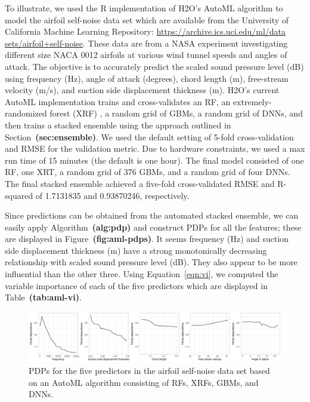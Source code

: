 \documentclass[12pt]{article}
\def\ref#1{\textbf{(#1)}}
\begin{document}
To illustrate, we used the R implementation of H2O's AutoML algorithm to model the airfoil self-noise data set \citep{uciml} which are available from the University of California Machine Learning Repository: \url{https://archive.ics.uci.edu/ml/data sets/airfoil+self-noise}. These data are from a NASA experiment investigating different size NACA 0012 airfoils at various wind tunnel speeds and angles of attack. The objective is to accurately predict the scaled sound pressure level (dB) using frequency (Hz), angle of attack (degrees), chord length (m), free-stream velocity (m/s), and suction side displacement thickness (m). H2O's current AutoML implementation trains and cross-validates an RF, an extremely-randomized forest (XRF) \citep{extremely-geurts-2006}, a random grid of GBMs, a random grid of DNNs, and then trains a stacked ensemble using the approach outlined in Section~\ref{sec:ensemble}. We used the default setting of 5-fold cross-validation and RMSE for the validation metric. Due to hardware constraints, we used a max run time of 15 minutes (the default is one hour). The final model consisted of one RF, one XRT, a random grid of 376 GBMs, and a random grid of four DNNs. The final stacked ensemble achieved a five-fold cross-validated RMSE and R-squared of 1.7131835 and 0.93870246, respectively.

Since predictions can be obtained from the automated stacked ensemble, we can easily apply Algorithm~\ref{alg:pdp} and construct PDPs for all the features; these are displayed in Figure~\ref{fig:aml-pdps}. It seems frequency (Hz) and suction side displacement thickness (m) have a strong monotonically decreasing relationship with scaled sound pressure level (dB). They also appear to be more influential than the other three. Using Equation~\eqref{eqn:vi}, we computed the variable importance of each of the five predictors which are displayed in Table~\ref{tab:aml-vi}. 

\begin{figure}[!htb]
  \centering
  \includegraphics[width=1.0\textwidth]{aml_pdps}
  \caption{PDPs for the five predictors in the airfoil self-noise data set based on an AutoML algorithm consisting of RFs, XRFs, GBMs, and DNNs. \label{fig:aml-pdps}}
\end{figure}
\end{document}
